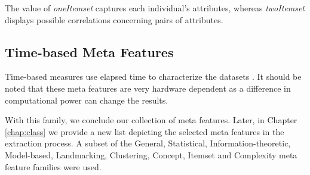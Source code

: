 The value of \textit{oneItemset} captures each individual’s attributes, whereas \textit{twoItemset} displays possible correlations concerning pairs of attributes.

\subsection{Time-based Meta Features}
Time-based measures use elapsed time to characterize the datasets \citep{reif2011prediction}. It should be noted that these meta features are very hardware dependent as a difference in computational power can change the results.

With this family, we conclude our collection of meta features. Later, in Chapter \ref{chap:class} we provide a new list depicting the selected meta features in the extraction process. A subset of the General, Statistical, Information-theoretic, Model-based, Landmarking, Clustering, Concept, Itemset and Complexity meta feature families were used. 
